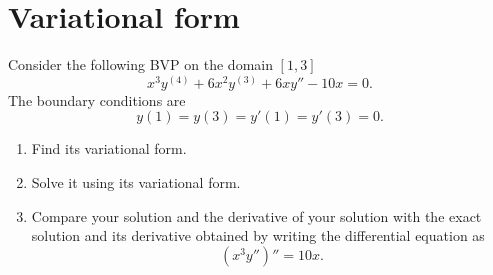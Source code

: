 \section{Variational form}
Consider the following BVP on the domain \([1,3]\)
\[ x^3y^{(4)}+6x^2y^{(3)}+6xy''-10x=0. \]
The boundary conditions are
\[ y(1)=y(3)=y'(1)=y'(3)=0. \]
\begin{enumerate}
	\item Find its variational form.
	\item Solve it using its variational form.
	\item Compare your solution and the derivative of your solution with the exact solution and its derivative obtained by writing the differential equation as
	\[ \left(x^3 y''\right)''=10x. \]
\end{enumerate}